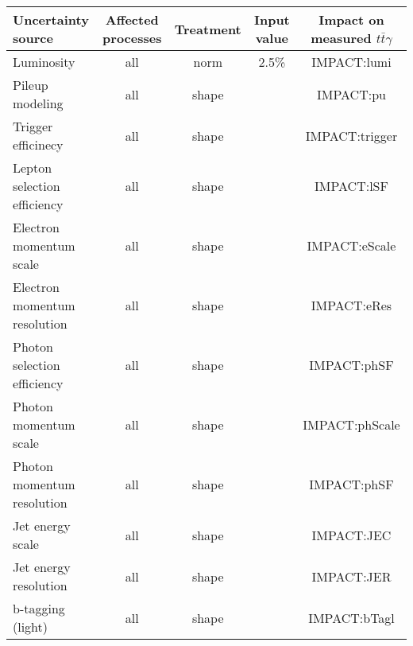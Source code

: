 \begin{table}
  \tiny
  \begin{tabular}{l|c|c|c|c}
    Uncertainty source                      & Affected processes                   & Treatment                     & Input value    & Impact on measured $t\bar{t}\gamma$        \\
    \hline
    Luminosity                              & all                                  & norm                          & 2.5\%          & IMPACT:lumi       \\
    Pileup modeling                         & all                                  & shape                         &                & IMPACT:pu       \\
    Trigger efficinecy                      & all                                  & shape                         &                & IMPACT:trigger       \\
    Lepton selection efficiency             & all                                  & shape                         &                & IMPACT:lSF       \\
    Electron momentum scale                 & all                                  & shape                         &                & IMPACT:eScale       \\
    Electron momentum resolution            & all                                  & shape                         &                & IMPACT:eRes       \\
    Photon selection efficiency             & all                                  & shape                         &                & IMPACT:phSF       \\
    Photon momentum scale                   & all                                  & shape                         &                & IMPACT:phScale       \\
    Photon momentum resolution              & all                                  & shape                         &                & IMPACT:phSF       \\
    Jet energy scale                        & all                                  & shape                         &                & IMPACT:JEC       \\
    Jet energy resolution                   & all                                  & shape                         &                & IMPACT:JER       \\
    b-tagging (light)                       & all                                  & shape                         &                & IMPACT:bTagl       \\

\end{tabular}
\end{table}
